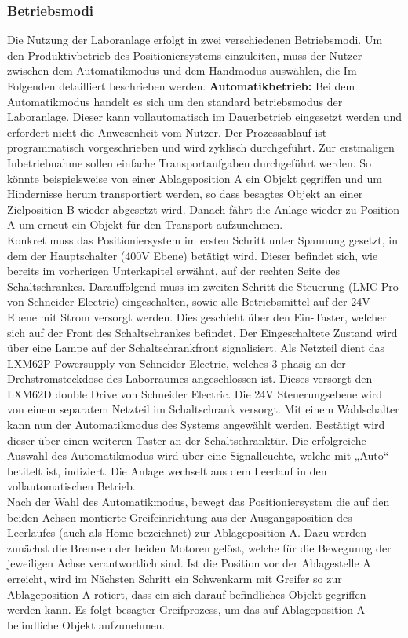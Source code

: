 \documentclass[../Bachelorarbeit.tex]{subfiles}
\begin{document}
\subsubsection{Betriebsmodi}
Die Nutzung der Laboranlage erfolgt in zwei verschiedenen Betriebsmodi. Um den Produktivbetrieb des Positioniersystems einzuleiten, muss der Nutzer zwischen dem Automatikmodus und dem Handmodus auswählen, die Im Folgenden detailliert beschrieben werden.
\bigskip
\newline
\textbf{Automatikbetrieb:} Bei dem Automatikmodus handelt es sich um den standard betriebsmodus der Laboranlage. Dieser kann vollautomatisch im Dauerbetrieb eingesetzt werden und erfordert nicht die Anwesenheit vom Nutzer. Der Prozessablauf ist programmatisch vorgeschrieben und wird zyklisch durchgeführt. Zur erstmaligen Inbetriebnahme sollen einfache Transportaufgaben durchgeführt werden. So könnte beispielsweise von einer Ablageposition A ein Objekt gegriffen und um Hindernisse herum transportiert werden, so dass besagtes Objekt an einer Zielposition B wieder abgesetzt wird. Danach fährt die Anlage wieder zu Position A um erneut ein Objekt für den Transport aufzunehmen.\\
Konkret muss das Positioniersystem im ersten Schritt unter Spannung gesetzt, in dem der Hauptschalter (400V Ebene) betätigt wird. Dieser befindet sich, wie bereits im vorherigen Unterkapitel erwähnt, auf der rechten Seite des Schaltschrankes. Darauffolgend muss im zweiten Schritt die Steuerung (LMC Pro von Schneider Electric) eingeschalten, sowie alle Betriebsmittel auf der 24V Ebene mit Strom versorgt werden. Dies geschieht über den Ein-Taster, welcher sich auf der Front des Schaltschrankes befindet. Der Eingeschaltete Zustand wird über eine Lampe auf der Schaltschrankfront signalisiert. Als Netzteil dient das LXM62P Powersupply von Schneider Electric, welches 3-phasig an der Drehstromsteckdose des Laborraumes angeschlossen ist. Dieses versorgt den LXM62D double Drive von Schneider Electric. Die 24V Steuerungsebene wird von einem separatem Netzteil im Schaltschrank versorgt. Mit einem Wahlschalter kann nun der Automatikmodus des Systems angewählt werden. Bestätigt wird dieser über einen weiteren Taster an der Schaltschranktür. Die erfolgreiche Auswahl des Automatikmodus wird über eine Signalleuchte, welche mit „Auto“ betitelt ist, indiziert. Die Anlage wechselt aus dem Leerlauf in den vollautomatischen Betrieb.\\ 
Nach der Wahl des Automatikmodus, bewegt das Positioniersystem die auf den beiden Achsen montierte Greifeinrichtung aus der Ausgangsposition des Leerlaufes (auch als Home bezeichnet) zur Ablageposition A. Dazu werden zunächst die Bremsen der beiden Motoren gelöst, welche für die Bewegunng der jeweiligen Achse verantwortlich sind. Ist die Position vor der Ablagestelle A erreicht, wird im Nächsten Schritt ein Schwenkarm mit Greifer so zur Ablageposition A rotiert, dass ein sich darauf befindliches Objekt gegriffen werden kann. Es folgt besagter Greifprozess, um das auf Ablageposition A befindliche Objekt aufzunehmen.\\
\end{document}
